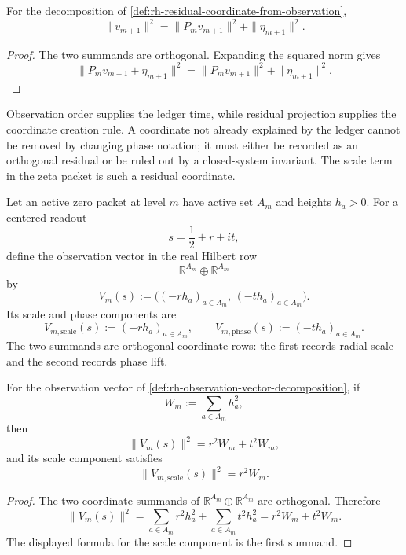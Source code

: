 \begin{theorem}
\label{thm:rh-residual-pythagorean-identity}
For the decomposition of
\autoref{def:rh-residual-coordinate-from-observation},
$$
\|v_{m+1}\|^2
=
\|P_m v_{m+1}\|^2+\|\eta_{m+1}\|^2.
$$
\end{theorem}

\begin{proof}
The two summands are orthogonal.  Expanding the squared norm gives
$$
\|P_m v_{m+1}+\eta_{m+1}\|^2
=
\|P_m v_{m+1}\|^2+\|\eta_{m+1}\|^2.
$$
\end{proof}

\begin{principle}
\label{prin:rh-residual-coordinate-conservation}
Observation order supplies the ledger time, while residual projection
supplies the coordinate creation rule.  A coordinate not already
explained by the ledger cannot be removed by changing phase notation; it
must either be recorded as an orthogonal residual or be ruled out by a
closed-system invariant.  The scale term in the zeta packet is such a
residual coordinate.
\end{principle}

\begin{definition}
\label{def:rh-observation-vector-decomposition}
Let an active zero packet at level $m$ have active set $A_m$ and heights
$h_a>0$.  For a centered readout
$$
s=\frac12+r+it,
$$
define the observation vector in the real Hilbert row
$$
\mathbb R^{A_m}\oplus\mathbb R^{A_m}
$$
by
$$
V_m(s)
:=
\bigl((-r h_a)_{a\in A_m},\,(-t h_a)_{a\in A_m}\bigr).
$$
Its scale and phase components are
$$
V_{m,\mathrm{scale}}(s):=(-r h_a)_{a\in A_m},
\qquad
V_{m,\mathrm{phase}}(s):=(-t h_a)_{a\in A_m}.
$$
The two summands are orthogonal coordinate rows: the first records
radial scale and the second records phase lift.
\end{definition}

\begin{theorem}
\label{thm:rh-observation-vector-pythagorean-identity}
For the observation vector of
\autoref{def:rh-observation-vector-decomposition}, if
$$
W_m:=\sum_{a\in A_m}h_a^2,
$$
then
$$
\|V_m(s)\|^2
=
r^2W_m+t^2W_m,
$$
and its scale component satisfies
$$
\|V_{m,\mathrm{scale}}(s)\|^2=r^2W_m.
$$
\end{theorem}

\begin{proof}
The two coordinate summands of
$\mathbb R^{A_m}\oplus\mathbb R^{A_m}$ are orthogonal.  Therefore
$$
\|V_m(s)\|^2
=
\sum_{a\in A_m}r^2h_a^2
+
\sum_{a\in A_m}t^2h_a^2
=
r^2W_m+t^2W_m.
$$
The displayed formula for the scale component is the first summand.
\end{proof}

